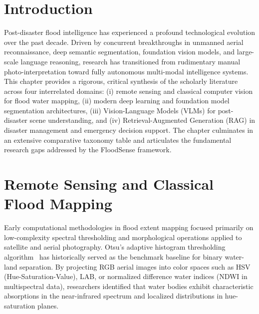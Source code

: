 \label{chap:literature_survey}

\section{Introduction}
Post-disaster flood intelligence has experienced a profound technological evolution over the past decade. Driven by concurrent breakthroughs in unmanned aerial reconnaissance, deep semantic segmentation, foundation vision models, and large-scale language reasoning, research has transitioned from rudimentary manual photo-interpretation toward fully autonomous multi-modal intelligence systems. This chapter provides a rigorous, critical synthesis of the scholarly literature across four interrelated domains: (i) remote sensing and classical computer vision for flood water mapping, (ii) modern deep learning and foundation model segmentation architectures, (iii) Vision-Language Models (VLMs) for post-disaster scene understanding, and (iv) Retrieval-Augmented Generation (RAG) in disaster management and emergency decision support. The chapter culminates in an extensive comparative taxonomy table and articulates the fundamental research gaps addressed by the FloodSense framework.

\section{Remote Sensing and Classical Flood Mapping}
Early computational methodologies in flood extent mapping focused primarily on low-complexity spectral thresholding and morphological operations applied to satellite and aerial photography. Otsu's adaptive histogram thresholding algorithm~\cite{otsu1979threshold} has historically served as the benchmark baseline for binary water-land separation. By projecting RGB aerial images into color spaces such as HSV (Hue-Saturation-Value), LAB, or normalized difference water indices (NDWI in multispectral data), researchers identified that water bodies exhibit characteristic absorptions in the near-infrared spectrum and localized distributions in hue-saturation planes.

